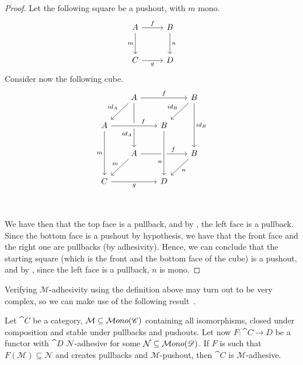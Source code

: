 \begin{proof}
	Let the following square be a pushout, with $m$ mono.
	\[\begin{tikzcd}[row sep = 26, column sep = 26]
		A \ar[r, "f"] \ar[d, "m"swap] & B \ar[d, "n"] \\
		C \ar[r, "g"swap] & D
	\end{tikzcd}\]
	Consider now the following cube.
	\[\begin{tikzcd}[row sep = 20, column sep = 20]
	& A && B \\
	A && B \\
	& A && B \\
	C && D \\
	& {}
	\arrow["f", from=1-2, to=1-4]
	\arrow["{id_A}"', from=1-2, to=2-1]
	\arrow["{id_A}"'{pos=0.7}, from=1-2, to=3-2]
	\arrow["{id_B}"', from=1-4, to=2-3]
	\arrow["{id_B}", from=1-4, to=3-4]
	\arrow["m"', from=2-1, to=4-1]
	\arrow["f"{pos=0.7}, from=3-2, to=3-4]
	\arrow["m"', from=3-2, to=4-1]
	\arrow["n", from=3-4, to=4-3]
	\arrow["g"', from=4-1, to=4-3]
	\arrow["f"{pos=0.7}, from=2-1, to=2-3, crossing over]
	\arrow["n"'{pos=0.7}, from=2-3, to=4-3, crossing over]
	\end{tikzcd}\]

	We have then that the top face is a pullback, and by , the left face is a pullback. Since the bottom face is a pushout by hypothesis, we have that the front face and the right one are pullbacks (by adhesivity). Hence, we can conclude that the starting square (which is the front and the bottom face of the cube) is a pushout, and by , since the left face is a pullback, $n$ is mono.
\end{proof}

Verifying $\mathcal M$-adhesivity using the definition above may turn out to be very complex, so we can make use of the following result~\cite{castelnovo2022newcriterionmathcalmmathcalnadhesivity}. 

\begin{theorem}\label{th:crit_for_adh}
    Let $\cat C$ be a category, $\mathcal M \subseteq \mathcal{M}ono(\mathscr{C})$ containing all isomorphisms, closed under composition and stable under pullbacks and pushouts. Let now $F: \cat{C \rightarrow D}$ be a functor with $\cat D$ $\mathcal{N}$-adhesive for some $\mathcal{N} \subseteq \mathcal{M}ono(\mathscr{D})$.
    If $F$ is such that $F(\mathcal{M}) \subseteq \mathcal N$ and creates pullbacks and $\mathcal{M}$-pushout, then $\cat C$ is $\mathcal M$-adhesive.
\end{theorem}

